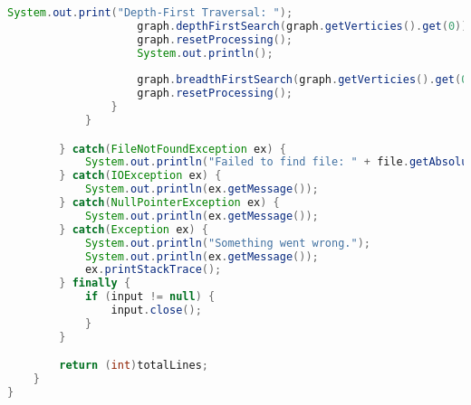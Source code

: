 \documentclass[letterpaper, 10pt,DIV=13]{scrartcl}
\numberwithin{equation}{section} %
\numberwithin{figure}{section} %
\numberwithin{table}{section} %
\begin{document}
\begin{lstlisting}[frame=single, language=java, breaklines]
                    System.out.print("Depth-First Traversal: ");
                    graph.depthFirstSearch(graph.getVerticies().get(0));
                    graph.resetProcessing();
                    System.out.println();
                    
                    graph.breadthFirstSearch(graph.getVerticies().get(0));
                    graph.resetProcessing();
                }
            }

        } catch(FileNotFoundException ex) {
            System.out.println("Failed to find file: " + file.getAbsolutePath());
        } catch(IOException ex) {
            System.out.println(ex.getMessage());
        } catch(NullPointerException ex) {
            System.out.println(ex.getMessage());
        } catch(Exception ex) {
            System.out.println("Something went wrong.");
            System.out.println(ex.getMessage());
            ex.printStackTrace();
        } finally {
            if (input != null) {
                input.close();
            }
        }

        return (int)totalLines;
    }
}
\end{lstlisting}
\end{document}
